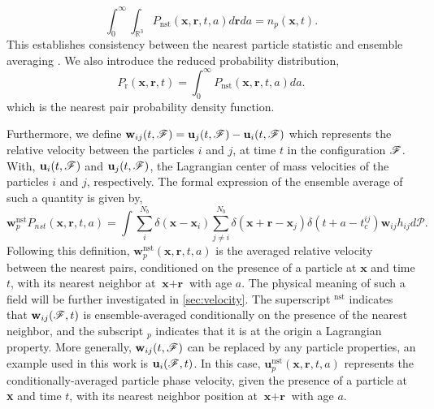 \begin{equation*}
    \int_0^\infty 
    \int_{\mathbb{R}^3}
     P_\text{nst}(\textbf{x},\textbf{r},t,a) d\textbf{r} da = n_p(\textbf{x},t). 
    \label{eq:Pnst}
\end{equation*}
This establishes consistency between the nearest particle statistic and ensemble averaging \citep{zhang2021ensemble}. 
We also introduce the reduced probability distribution,
\begin{equation*}
    P_\text{r}(\textbf{x},\textbf{r},t)
    = \int_0^\infty P_\text{nst}(\textbf{x},\textbf{r},t,a) da.
\end{equation*}
which is the nearest pair probability density function.


Furthermore, we define $\textbf{w}_{ij}(t,\mathscr{F}) = \textbf{u}_j(t,\mathscr{F}) - \textbf{u}_i(t,\mathscr{F})$ which represents the relative velocity between the particles $i$ and $j$, at time $t$ in the configuration $\mathscr{F}$. 
With, $\textbf{u}_i(t,\mathscr{F})$ and $\textbf{u}_j(t,\mathscr{F})$, the Lagrangian center of mass velocities of the particles $i$ and $j$, respectively. 
The formal expression of the ensemble average of such a quantity is given by,
\begin{equation*}
    \textbf{w}^\text{nst}_p P_{nst}(\textbf{x},\textbf{r},t,a)
    = 
    \int \sum_{i}^{N_b}\delta(\textbf{x}-\textbf{x}_i)
    \sum_{j\neq i}^{N_b}\delta(\textbf{x}+\textbf{r}-\textbf{x}_j) 
    \delta(t+a-t_c^{ij}) 
    \textbf{w}_{ij}
    h_{ij} 
    d\mathscr{P}.
    \label{eq:q_nstij}
\end{equation*}
Following this definition, $\textbf{w}^\text{nst}_p(\textbf{x},\textbf{r},t,a)$ is the averaged relative velocity between the nearest pairs, conditioned on the presence of a particle at $\textbf{x}$ and time $t$, with its nearest neighbor at $\textbf{x}+\textbf{r}$ with age $a$. 
The physical meaning of such a field will be further investigated in \ref{sec:velocity}. 
The superscript $^\text{nst}$ indicates that $\textbf{w}_{ij}(\mathscr{F},t)$ is ensemble-averaged conditionally on the presence of the nearest neighbor, and the subscript $_p$ indicates that it is at the origin a Lagrangian property. 
More generally, $\textbf{w}_{ij}(t,\mathscr{F})$ can be replaced by any particle properties, an example used in this work is $\textbf{u}_i(\mathscr{F},t)$.
In this case, $\textbf{u}^\text{nst}_p(\textbf{x},\textbf{r},t,a)$ represents the conditionally-averaged particle phase velocity, given the presence of a particle at \textbf{x} and time $t$, with its nearest neighbor position at $\textbf{x}+\textbf{r}$ with age $a$. 


